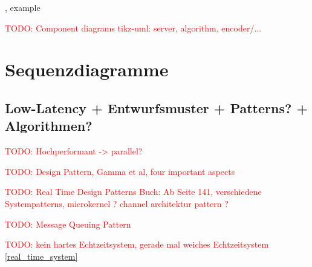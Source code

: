 \documentclass[
	12pt,
	table,
	bigheadings,
	ngerman,
	a4paper,
	BCOR5mm,
	DIV14,
	1.1headlines,
	pagesize,
	oneside,
	openright,
	titlepage,
	headsepline,
	nochapterprefix,
	bibtotoc,
	tocindent,
	listsindent,
	pointlessnumbers,
	cleardoubleempty,
	fleqn,
	halfparskip
]{scrbook}
\newcommand{\todo}[1]{\textcolor{red}{TODO: #1}}
\begin{document}
		\begin{figure}[H]
			\centering
		\end{figure}
		
		\cite[446]{goll2012methoden}, example \cite[457]{goll2012methoden}
		  
		\todo{Component diagrams tikz-uml: server, algorithm, encoder/...}		
		
		\section{Sequenzdiagramme}
		
		\subsection{Low-Latency + Entwurfsmuster + Patterns? + Algorithmen?}
		\todo{Hochperformant -> parallel?}
		
		\todo{Design Pattern, Gamma et al, four important aspects}
		
		\todo{Real Time Design Patterns Buch: Ab Seite 141, verschiedene Systempatterns, microkernel \cite[151]{douglass2003real}? channel architektur pattern \cite[167]{douglass2003real}?}
		
		\todo{Message Queuing Pattern \cite[207]{douglass2003real}}
		
		\todo{kein hartes Echtzeitsystem, gerade mal weiches Echtzeitsystem \autoref{real_time_system}}
		
\end{document}
